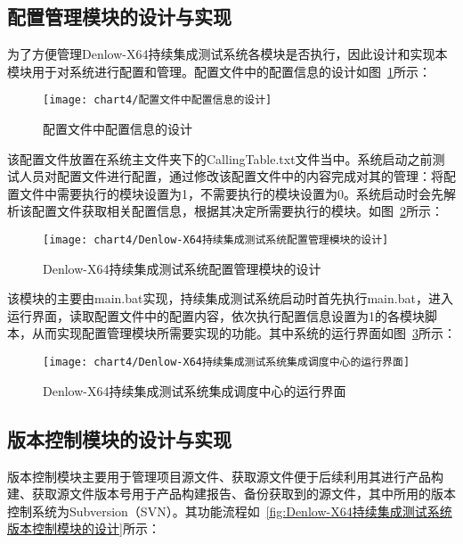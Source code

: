 	\subsection{配置管理模块的设计与实现}
		
		为了方便管理Denlow-X64持续集成测试系统各模块是否执行，因此设计和实现本模块用于对系统进行配置和管理。配置文件中的配置信息的设计如图~\ref{fig:配置文件中配置信息的设计}所示：
		
		\begin{figure}[H] %
			\centering
			\texttt{[image: chart4/配置文件中配置信息的设计]}
			\caption{配置文件中配置信息的设计}
			\label{fig:配置文件中配置信息的设计}
		\end{figure}
		
		该配置文件放置在系统主文件夹下的CallingTable.txt文件当中。系统启动之前测试人员对配置文件进行配置，通过修改该配置文件中的内容完成对其的管理：将配置文件中需要执行的模块设置为1，不需要执行的模块设置为0。系统启动时会先解析该配置文件获取相关配置信息，根据其决定所需要执行的模块。如图~\ref{fig:Denlow-X64持续集成测试系统配置管理模块的设计}所示：
		
		\begin{figure}[H] %
			\centering
			\texttt{[image: chart4/Denlow-X64持续集成测试系统配置管理模块的设计]}
			\caption{Denlow-X64持续集成测试系统配置管理模块的设计}
			\label{fig:Denlow-X64持续集成测试系统配置管理模块的设计}
		\end{figure}
		
		该模块的主要由main.bat实现，持续集成测试系统启动时首先执行main.bat，进入运行界面，读取配置文件中的配置内容，依次执行配置信息设置为1的各模块脚本，从而实现配置管理模块所需要实现的功能。其中系统的运行界面如图~\ref{fig:Denlow-X64持续集成测试系统集成调度中心的运行界面}所示：
			
		\begin{figure}[H] %
			\centering
			\texttt{[image: chart4/Denlow-X64持续集成测试系统集成调度中心的运行界面]}
			\caption{Denlow-X64持续集成测试系统集成调度中心的运行界面}
			\label{fig:Denlow-X64持续集成测试系统集成调度中心的运行界面}
		\end{figure}
	
	\subsection{版本控制模块的设计与实现}
		版本控制模块主要用于管理项目源文件、获取源文件便于后续利用其进行产品构建、获取源文件版本号用于产品构建报告、备份获取到的源文件，其中所用的版本控制系统为Subversion（SVN）。其功能流程如~\ref{fig:Denlow-X64持续集成测试系统版本控制模块的设计}所示：
		
